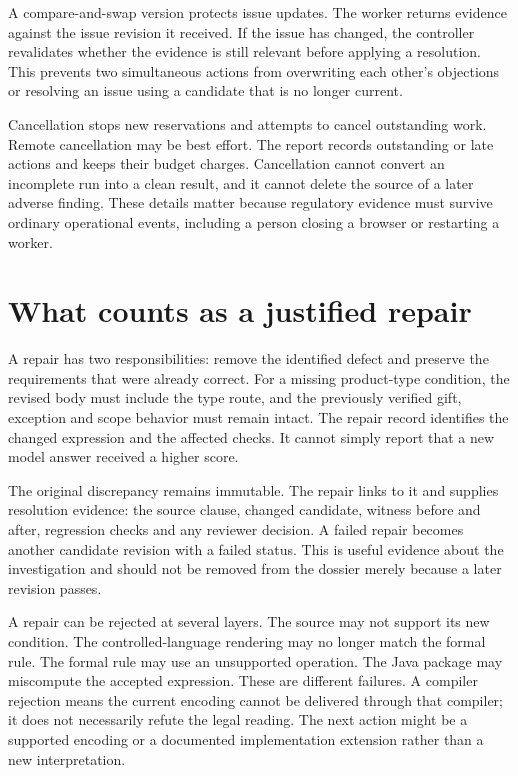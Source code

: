 A compare-and-swap version protects issue updates. The worker returns evidence
against the issue revision it received. If the issue has changed, the controller
revalidates whether the evidence is still relevant before applying a resolution.
This prevents two simultaneous actions from overwriting each other's objections
or resolving an issue using a candidate that is no longer current.

Cancellation stops new reservations and attempts to cancel outstanding work.
Remote cancellation may be best effort. The report records outstanding or late
actions and keeps their budget charges. Cancellation cannot convert an incomplete
run into a clean result, and it cannot delete the source of a later adverse
finding. These details matter because regulatory evidence must survive ordinary
operational events, including a person closing a browser or restarting a worker.

\section{What counts as a justified repair}
\label{merge:M06:18}


A repair has two responsibilities: remove the identified defect and preserve the
requirements that were already correct. For a missing product-type condition,
the revised body must include the type route, and the previously verified gift,
exception and scope behavior must remain intact. The repair record identifies the
changed expression and the affected checks. It cannot simply report that a new
model answer received a higher score.

The original discrepancy remains immutable. The repair links to it and supplies
resolution evidence: the source clause, changed candidate, witness before and
after, regression checks and any reviewer decision. A failed repair becomes
another candidate revision with a failed status. This is useful evidence about
the investigation and should not be removed from the dossier merely because a
later revision passes.

A repair can be rejected at several layers. The source may not support its new
condition. The controlled-language rendering may no longer match the formal
rule. The formal rule may use an unsupported operation. The Java package may
miscompute the accepted expression. These are different failures. A compiler
rejection means the current encoding cannot be delivered through that compiler;
it does not necessarily refute the legal reading. The next action might be a
supported encoding or a documented implementation extension rather than a new
interpretation.

